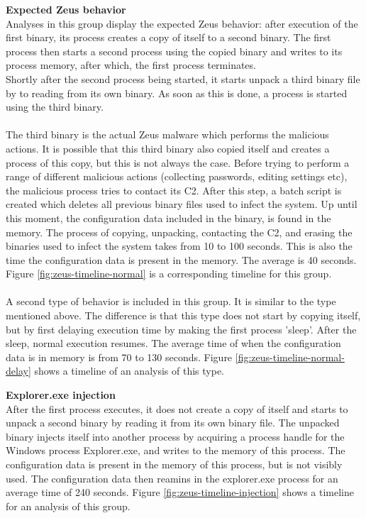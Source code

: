 \documentclass[conference]{IEEEtran}
\begin{document}
\newpage
\textbf{Expected Zeus behavior}
\\Analyses in this group display the expected Zeus behavior: \cite{wyke-zeus} after execution of the first binary, its process creates a copy of itself to a second binary. The first process then starts a second process using the copied binary and writes to its process memory, after which, the first process terminates.\\ Shortly after the second process being started, it starts unpack a third binary file by to reading from its own binary. As soon as this is done, a process is started using the third binary.
\\\\The third binary is the actual Zeus malware which performs the malicious actions. It is possible that this third binary also copied itself and creates a process of this copy, but this is not always the case. Before trying to perform a range of different malicious actions (collecting passwords, editing settings etc), the malicious process tries to contact its C2. After this step, a batch script is created which deletes all previous binary files used to infect the system. Up until this moment, the configuration data included in the binary, is found in the memory. The process of copying, unpacking, contacting the C2, and erasing the binaries used to infect the system takes from 10 to 100 seconds. This is also the time the configuration data is present in the memory. The average is 40 seconds.  Figure \ref{fig:zeus-timeline-normal} is a corresponding timeline for this group. \\\\A second type of behavior is included in this group. It is similar to the type mentioned above. The difference is that this type does not start by copying itself, but by first delaying execution time by making the first process 'sleep'. After the sleep, normal execution resumes. The average time of when the configuration data is in memory is from 70 to 130 seconds. Figure \ref{fig:zeus-timeline-normal-delay} shows a timeline of an analysis of this type.


\newpage

\textbf{Explorer.exe injection}
\\After the first process executes, it does not create a copy of itself and starts to unpack a second binary by reading it from its own binary file. The unpacked binary injects itself into another process by acquiring a process handle for the Windows process Explorer.exe, and writes to the memory of this process. The configuration data is present in the memory of this process, but is not visibly used. The configuration data then reamins in the explorer.exe process for an average time of 240 seconds. Figure \ref{fig:zeus-timeline-injection} shows a timeline for an analysis of this group.\\
\end{document}
